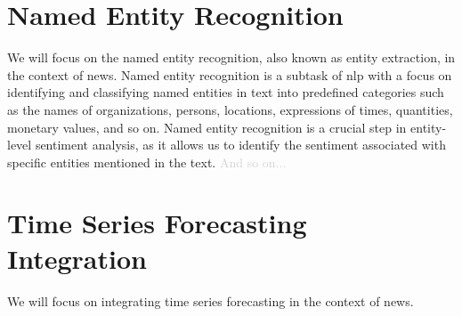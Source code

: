 \section{Named Entity Recognition}
\label{sec:named-entity-recognition}
We will focus on the named entity recognition, also known as entity extraction, in the context of news. 
Named entity recognition is a subtask of \acrshort{nlp} with a focus on identifying and classifying named entities in text into predefined categories such as the names of organizations, persons, locations, expressions of times, quantities, monetary values, and so on. Named entity recognition is a crucial step in entity-level sentiment analysis, as it allows us to identify the sentiment associated with specific entities mentioned in the text. \textcolor{lightgray}{And so on...} %

\section{Time Series Forecasting Integration}
\label{sec:integration-with-time-series-forecasting-for-market-trends}
We will focus on integrating time series forecasting in the context of news.

